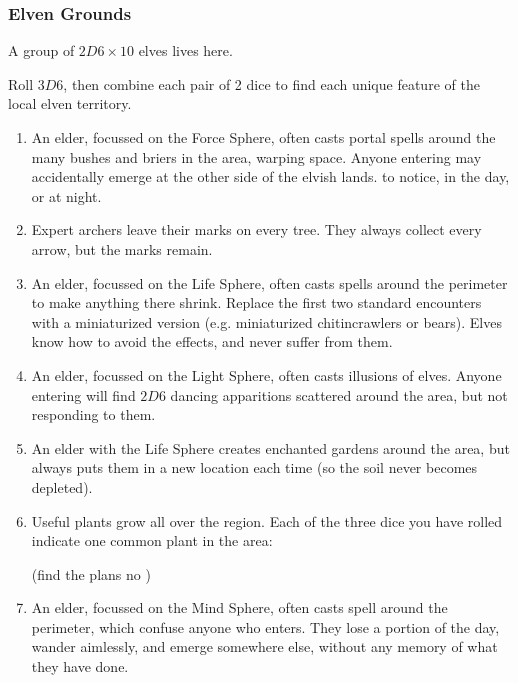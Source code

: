 \begin{multicols}{2}
\subsubsection{Elven Grounds}
\label{elvesPoint}

A group of $2D6 \times 10$ elves lives here.

Roll $3D6$, then combine each pair of 2 dice to find each unique feature of the local elven territory.

\begin{enumerate}
  \item
  An elder, focussed on the Force Sphere, often casts portal spells around the many bushes and briers in the area, warping space.
  Anyone entering may accidentally emerge at the other side of the elvish lands.
   to notice, \tn[7] in the day, or \tn[12] at night.
  \item
  Expert archers leave their marks on every tree.
  They always collect every arrow, but the marks remain.
  \item
  An elder, focussed on the Life Sphere, often casts spells around the perimeter to make anything there shrink.
  Replace the first two standard encounters with a miniaturized version (e.g. miniaturized chitincrawlers or bears).
  Elves know how to avoid the effects, and never suffer from them.
  \item
  An elder, focussed on the Light Sphere, often casts illusions of elves.
  Anyone entering will find $2D6$ dancing apparitions scattered around the area, but not responding to them.
  \item
  An elder with the Life Sphere creates enchanted gardens around the area, but always puts them in a new location each time (so the soil never becomes depleted).
  \item
  Useful plants grow all over the region.
  Each of the three dice you have rolled indicate one common plant in the area:
  (find the plans no )
  \item
  An elder, focussed on the Mind Sphere, often casts spell around the perimeter, which confuse anyone who enters.
  They lose a portion of the day, wander aimlessly, and emerge somewhere else, without any memory of what they have done.


\end{enumerate}
\end{multicols}
